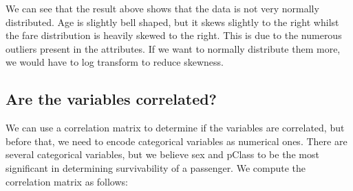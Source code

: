 \documentclass[twoside,11pt]{article}
\begin{document}
We can see that the result above shows that the data is not very normally distributed. Age is slightly bell shaped, but it skews slightly to the right whilst the fare distribution is heavily skewed to the right. This is due to the numerous outliers present in the attributes. If we want to normally distribute them more, we would have to log transform to reduce skewness.

\subsection*{Are the variables correlated?}

We can use a correlation matrix to determine if the variables are correlated, but before that, we need to encode categorical variables as numerical ones. There are several categorical variables, but we believe sex and pClass to be the most significant in determining survivability of a passenger. We compute the correlation matrix as follows:
\end{document}
